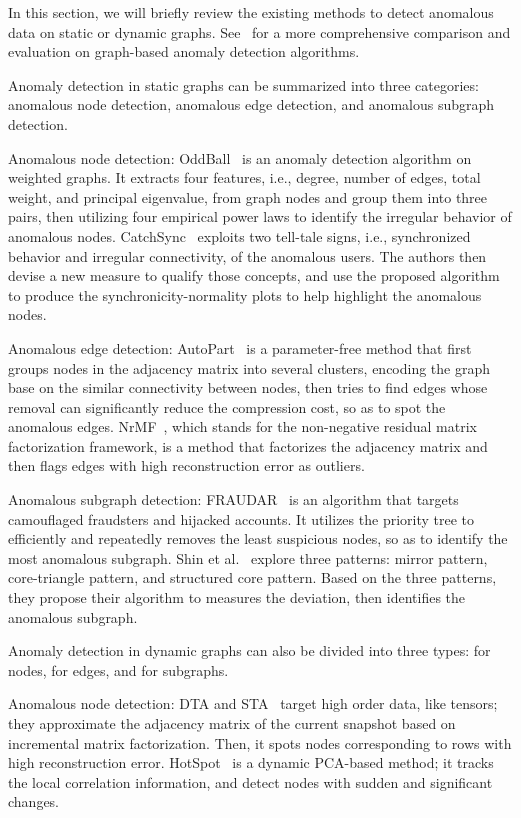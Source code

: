 \documentclass[5p]{elsarticle}
\begin{document}
	In this section, we will briefly review the existing methods to detect anomalous data on static or dynamic graphs. See~\cite{akoglu2015graph} for a more comprehensive comparison and evaluation on graph-based anomaly detection algorithms.

	Anomaly detection in static graphs can be summarized into three categories: anomalous node detection, anomalous edge detection, and anomalous subgraph detection.

	Anomalous node detection: OddBall~\cite{akoglu2010oddball} is an anomaly detection algorithm on weighted graphs. It extracts four features, i.e., degree, number of edges, total weight, and principal eigenvalue, from graph nodes and group them into three pairs, then utilizing four empirical power laws to identify the irregular behavior of anomalous nodes. CatchSync~\cite{jiang2016catching} exploits two tell-tale signs, i.e., synchronized behavior and irregular connectivity, of the anomalous users. The authors then devise a new measure to qualify those concepts, and use the proposed algorithm to produce the synchronicity-normality plots to help highlight the anomalous nodes.

	Anomalous edge detection: AutoPart~\cite{chakrabarti2004autopart} is a parameter-free method that first groups nodes in the adjacency matrix into several clusters, encoding the graph base on the similar connectivity between nodes, then tries to find edges whose removal can significantly reduce the compression cost, so as to spot the anomalous edges. NrMF~\cite{tong2011non}, which stands for the non-negative residual matrix factorization framework, is a method that factorizes the adjacency matrix and then flags edges with high reconstruction error as outliers.

	Anomalous subgraph detection: FRAUDAR~\cite{hooi2017graph} is an algorithm that targets camouflaged fraudsters and hijacked accounts. It utilizes the priority tree to efficiently and repeatedly removes the least suspicious nodes, so as to identify the most anomalous subgraph. Shin et al.~\cite{shin2018patterns} explore three patterns: mirror pattern, core-triangle pattern, and structured core pattern. Based on the three patterns, they propose their algorithm to measures the deviation, then identifies the anomalous subgraph.

	Anomaly detection in dynamic graphs can also be divided into three types: for nodes, for edges, and for subgraphs.

	Anomalous node detection: DTA and STA~\cite{sun2006beyond} target high order data, like tensors; they approximate the adjacency matrix of the current snapshot based on incremental matrix factorization. Then, it spots nodes corresponding to rows with high reconstruction error. HotSpot~\cite{yu2013on} is a dynamic PCA-based method; it tracks the local correlation information, and detect nodes with sudden and significant changes.
\end{document}
